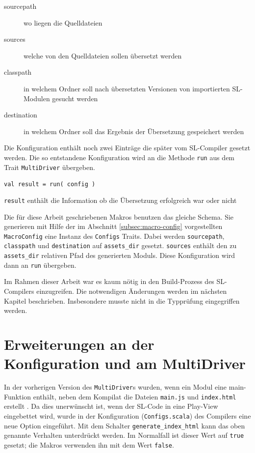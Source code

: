\documentclass[12pt,bibtotoc]{scrreprt}
\begin{document}
\begin{description}
 \item[sourcepath]{wo liegen die Quelldateien}
 \item[sources]{welche von den Quelldateien sollen übersetzt werden}
 \item[classpath]{in welchem Ordner soll nach übersetzten Versionen von importierten SL-Modulen gesucht werden}
 \item[destination]{in welchem Ordner soll das Ergebnis der Übersetzung gespeichert werden}
\end{description}

Die Konfiguration enthält noch zwei Einträge die später vom SL-Compiler gesetzt werden. Die so entstandene Konfiguration wird an die Methode \lstinline!run! aus dem Trait \lstinline!MultiDriver! \cite[S. 16-19]{Bisping2013} übergeben.

\begin{centering}
\lstinline!val result = run( config )!\\
\end{centering}

\lstinline!result! enthält die Information ob die Übersetzung erfolgreich war oder nicht

Die für diese Arbeit geschriebenen Makros benutzen das gleiche Schema. Sie generieren mit Hilfe der im Abschnitt \ref{subsec:macro-config} vorgestellten \lstinline!MacroConfig! eine Instanz des \lstinline!Configs! Traits. Dabei werden \lstinline!sourcepath!, \lstinline!classpath! und \lstinline!destination! auf \lstinline!assets_dir! gesetzt. \lstinline!sources! enthält den zu \lstinline!assets_dir! relativen Pfad des generierten Moduls. Diese Konfiguration wird dann an \lstinline!run! übergeben.

Im Rahmen dieser Arbeit war es kaum nötig in den Build-Prozess\cite[S. 16-19]{Bisping2013} des SL-Compilers einzugreifen. Die notwendigen Änderungen werden im nächsten Kapitel beschrieben. Insbesondere musste nicht in die Typprüfung eingegriffen werden.

\section{Erweiterungen an der Konfiguration und am MultiDriver}

In der vorherigen Version des \lstinline!MultiDriver!s wurden, wenn ein Modul eine main-Funktion enthält, neben dem Kompilat die Dateien \lstinline!main.js! und \lstinline!index.html! erstellt \cite[S. 18-19]{Bisping2013}. Da dies unerwünscht ist, wenn der \ac{SL}-Code in eine Play-View eingebettet wird, wurde in der Konfiguration (\lstinline!Configs.scala!) des Compilers eine neue Option eingeführt. Mit dem Schalter \lstinline!generate_index_html! kann das oben genannte Verhalten unterdrückt werden. Im Normalfall ist dieser Wert auf \lstinline!true! gesetzt; die Makros verwenden ihn mit dem Wert \lstinline!false!.
\end{document}
